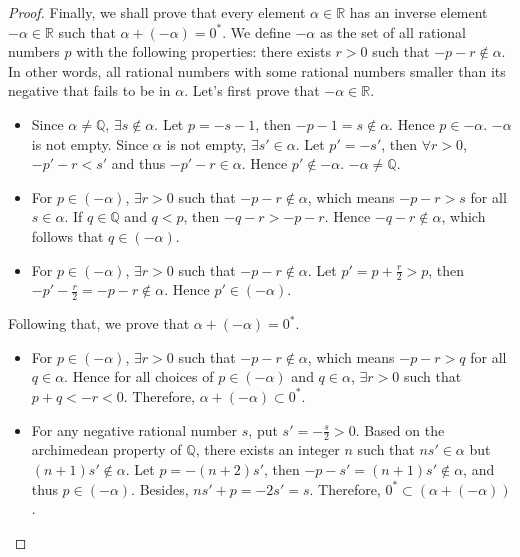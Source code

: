 \documentclass[onecolumn]{article}
\begin{document}
\begin{proof}
  Finally, we shall prove that every element $\alpha \in \mathbb{R}$ has an 
  inverse element $-\alpha \in \mathbb{R}$ such that $\alpha + (-\alpha) = 0^*$. 
  We define $-\alpha$ as the set of all rational numbers $p$ with the following 
  properties: there exists $r > 0$ such that $-p - r \notin \alpha$. In other 
  words, all rational numbers with some rational numbers smaller than its 
  negative that fails to be in $\alpha$. Let's first prove that 
  $-\alpha \in \mathbb{R}$.
  \begin{itemize}
    \item Since $\alpha \neq \mathbb{Q}$, $\exists s \notin \alpha$. Let 
    $p = -s - 1$, then $-p - 1 = s \notin \alpha$. Hence $p \in -\alpha$. 
    $-\alpha$ is not empty. Since $\alpha$ is not empty, $\exists s' \in \alpha$. 
    Let $p' = -s'$, then $\forall r > 0$, $-p' - r < s'$ and thus 
    $-p' - r \in \alpha$. Hence $p' \notin -\alpha$. $-\alpha \neq \mathbb{Q}$.
    \item For $p \in (-\alpha)$, $\exists r > 0$ such that $-p - r \notin \alpha$, 
    which means $-p - r > s$ for all $s \in \alpha$. If $q \in \mathbb{Q}$ and 
    $q < p$, then $-q - r > -p - r$. Hence $-q - r \notin \alpha$, which follows 
    that $q \in (-\alpha)$.
    \item  For $p \in (-\alpha)$, $\exists r > 0$ such that 
    $-p - r \notin \alpha$. Let $p' = p + \frac{r}{2} > p$, then 
    $-p' - \frac{r}{2} = -p - r \notin \alpha$. Hence $p' \in (-\alpha)$.
  \end{itemize}
  Following that, we prove that $\alpha + (-\alpha) = 0^*$.
  \begin{itemize}
    \item For $p \in (-\alpha)$, $\exists r > 0$ such that $-p - r \notin \alpha$, 
    which means $-p - r > q$ for all $q \in \alpha$. Hence for all choices of 
    $p \in (-\alpha)$ and $q \in \alpha$, $\exists r > 0$ such that 
    $p + q < -r < 0$. Therefore, $\alpha + (-\alpha) \subset 0^*$.
    \item For any negative rational number $s$, put $s' = -\frac{s}{2} > 0$. 
    Based on the archimedean property of $\mathbb{Q}$, there exists an integer 
    $n$ such that $ns' \in \alpha$ but $(n+1)s' \notin \alpha$. Let 
    $p = -(n+2)s'$, then $-p - s' = (n+1)s' \notin \alpha$, and thus 
    $p \in (-\alpha)$. Besides, $ns' + p = -2s' = s$. Therefore, 
    $0^* \subset (\alpha + (-\alpha))$.
  \end{itemize}
\end{proof}
\end{document}
